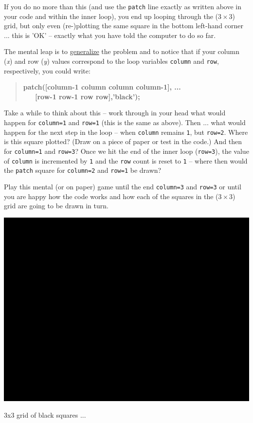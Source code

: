 \documentclass{tufte-book} %
\newenvironment{docspecbold}{\begin{quotation}\ttfamily\bfseries\parskip0pt\parindent0pt\ignorespaces}{\end{quotation}}
\begin{document}
If you do no more than this (and use the \texttt{patch} line exactly as written above in your code and within the inner loop), you end up looping through the (\(3\times3\)) grid, but only even (re-)plotting the same square in the bottom left-hand corner ... this is 'OK' -- exactly what you have told the computer to do so far.

The mental leap is to \uline{generalize} the problem and  to notice that if your column (\textit{x}) and row (\textit{y}) values correspond to the loop variables \texttt{column} and \texttt{row}, respectively, you could write:
\begin{docspecbold}
patch([column-1 column column column-1], ...\\
\ \ \ [row-1 row-1 row row],'black');
\end{docspecbold}
Take a while to think about this -- work through in your head what would happen for \texttt{column=1} and \texttt{row=1} (this is the same as above). Then ... what would happen for the next step in the loop -- when \texttt{column} remains \texttt{1}, but \texttt{row=2}. Where is this square plotted? (Draw on a piece of paper or test in the code.) And then for \texttt{column=1} and \texttt{row=3}? Once we hit the end of the inner loop (\texttt{row=3}), the value of \texttt{column} is incremented by \texttt{1} and the \texttt{row} count is reset to \texttt{1} -- where then would the \texttt{patch} square for \texttt{column=2} and \texttt{row=1} be drawn?

Play this mental (or on paper) game until the end \texttt{column=3} and \texttt{row=3} or until you are happy how the code works and how each of the squares in the (\(3\times3\)) grid are going to be drawn in turn.

\begin{marginfigure}[-1.5in]
\includegraphics[width=\linewidth]{ch4-grid1.eps}
\caption{3x3 grid of black squares ...}
\label{fig:ch4-grid1}
\end{marginfigure}
\end{document}
